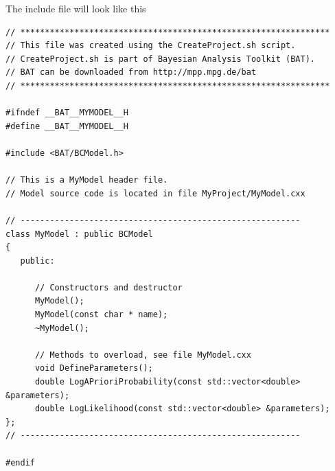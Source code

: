 \documentclass[11pt, a4paper]{article}
\begin{document}
The include file will look like this
%
\begin{verbatim}
// ***************************************************************
// This file was created using the CreateProject.sh script.
// CreateProject.sh is part of Bayesian Analysis Toolkit (BAT).
// BAT can be downloaded from http://mpp.mpg.de/bat
// ***************************************************************

#ifndef __BAT__MYMODEL__H
#define __BAT__MYMODEL__H

#include <BAT/BCModel.h>

// This is a MyModel header file.
// Model source code is located in file MyProject/MyModel.cxx

// ---------------------------------------------------------
class MyModel : public BCModel
{
   public:

      // Constructors and destructor
      MyModel();
      MyModel(const char * name);
      ~MyModel();

      // Methods to overload, see file MyModel.cxx
      void DefineParameters();
      double LogAPrioriProbability(const std::vector<double> &parameters);
      double LogLikelihood(const std::vector<double> &parameters);
};
// ---------------------------------------------------------

#endif
\end{verbatim}
\end{document}
